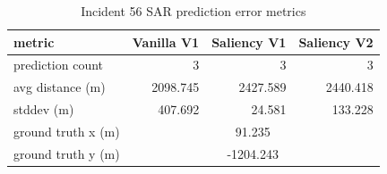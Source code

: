 \begin{table}[ht]
\centering
\caption{Incident 56 SAR prediction error metrics}
\label{tab:sar-incident-56}
\begin{tabular}{lrrr}
\hline
metric & Vanilla V1 & Saliency V1 & Saliency V2 \\
\hline
prediction count & 3 & 3 & 3 \\
avg distance (m) & 2098.745 & 2427.589 & 2440.418 \\
stddev (m) & 407.692 & 24.581 & 133.228 \\
ground truth x (m) & \multicolumn{3}{c}{91.235} \\
ground truth y (m) & \multicolumn{3}{c}{-1204.243} \\
\hline
\end{tabular}
\end{table}
